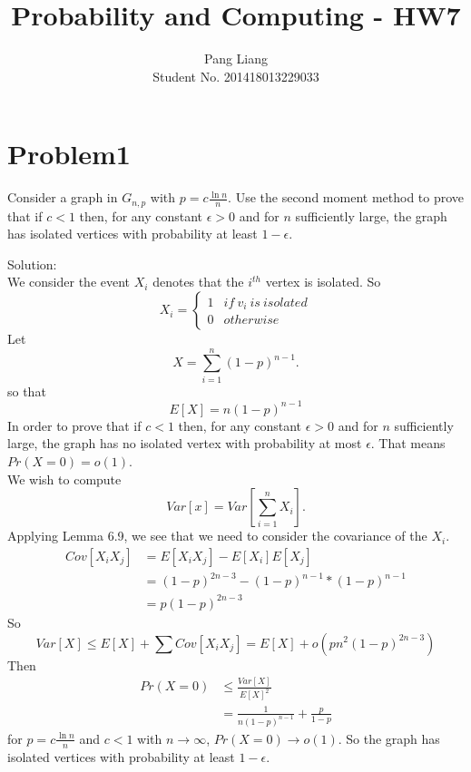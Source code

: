 \documentclass[12pt]{article}
\title{Probability and Computing - HW7}
\author{Pang Liang\\ Student No. 201418013229033}
\begin{document}
\maketitle

\section{Problem1}
Consider a graph in $G_{n,p}$ with $p = c\frac{\ln{n}}{n}$. Use the second moment method to prove that if $c < 1$ then, for any constant $\epsilon > 0$ and for $n$ sufficiently large, the graph has isolated vertices with probability at least $1-\epsilon$.

Solution:\\

We consider the event $X_i$ denotes that the $i^{th}$ vertex is isolated. So
\begin{equation}
    X_i = \left \{ \begin{array}{ll}
    1 & if\ v_i\ is\ isolated \\
    0 & otherwise
    \end{array}
    \right.
\end{equation}
Let
\begin{equation}
    X = \sum_{i=1}^{n} (1-p)^{n-1}.
\end{equation}
so that
\begin{equation}
    E[X] = n (1-p)^{n-1}
\end{equation}
In order to prove that if $c < 1$ then, for any constant $\epsilon > 0$ and for $n$ sufficiently large, the graph has no isolated vertex with probability at most $\epsilon$. That means $Pr(X=0)=o(1)$.\\
We wish to compute
\begin{equation}
    Var[x] = Var[\sum_{i=1}^{n} X_i].
\end{equation}
Applying Lemma 6.9, we see that we need to consider the covariance of the $X_i$.
\begin{equation}
    \begin{split}
    Cov[X_iX_j] &= E[X_iX_j]-E[X_i]E[X_j]\\
    &= (1-p)^{2n-3} - (1-p)^{n-1}*(1-p)^{n-1}\\
    &= p(1-p)^{2n-3}
    \end{split}
\end{equation}
So
\begin{equation}
    Var[X] \le E[X] + \sum Cov[X_iX_j] = E[X] + o(pn^2(1-p)^{2n-3})
\end{equation}
Then
\begin{equation}
    \begin{split}
    Pr(X=0) &\le \frac{Var[X]}{E[X]^2}\\
    &=\frac{1}{n (1-p)^{n-1}} + \frac{p}{1-p}
    \end{split}
\end{equation}
for $p = c\frac{\ln{n}}{n}$ and $c<1$ with $n \to \infty$, $Pr(X=0) \to o(1)$. So the graph has isolated vertices with probability at least $1-\epsilon$.
\end{document}

